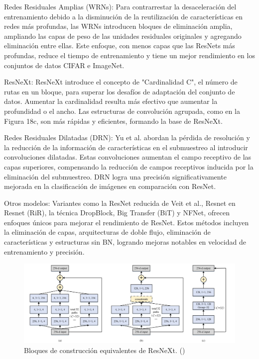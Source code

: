 \begin{itemize}
	Redes Residuales Amplias (WRNs): Para contrarrestar la desaceleración del entrenamiento debido a la disminución de la reutilización de características en redes más profundas, las WRNs introducen bloques de eliminación amplia, ampliando las capas de peso de las unidades residuales originales y agregando eliminación entre ellas. Este enfoque, con menos capas que las ResNets más profundas, reduce el tiempo de entrenamiento y tiene un mejor rendimiento en los conjuntos de datos CIFAR e ImageNet.
	
	ResNeXt: ResNeXt introduce el concepto de "Cardinalidad C", el número de rutas en un bloque, para superar los desafíos de adaptación del conjunto de datos. Aumentar la cardinalidad resulta más efectivo que aumentar la profundidad o el ancho. Las estructuras de convolución agrupada, como en la Figura 18c, son más rápidas y eficientes, formando la base de ResNeXt.
	
	Redes Residuales Dilatadas (DRN): Yu et al. abordan la pérdida de resolución y la reducción de la información de características en el submuestreo al introducir convoluciones dilatadas. Estas convoluciones aumentan el campo receptivo de las capas superiores, compensando la reducción de campos receptivos inducida por la eliminación del submuestreo. DRN logra una precisión significativamente mejorada en la clasificación de imágenes en comparación con ResNet.
	
	Otros modelos: Variantes como la ResNet reducida de Veit et al., Resnet en Resnet (RiR), la técnica DropBlock, Big Transfer (BiT) y NFNet, ofrecen enfoques únicos para mejorar el rendimiento de ResNet. Estos métodos incluyen la eliminación de capas, arquitecturas de doble flujo, eliminación de características y estructuras sin BN, logrando mejoras notables en velocidad de entrenamiento y precisión.
	
	\begin{figure}[H]
		\begin{center}
			\includegraphics[width=1\textwidth]{2/figures/cnn7.jpeg}
			\caption{Bloques de construcción equivalentes de ResNeXt.
				(\cite{tecnica2})}
		\end{center}
	\end{figure}
	

\end{itemize}
